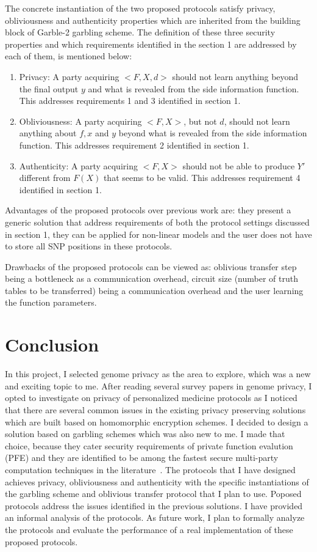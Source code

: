 \documentclass[10pt,letterpaper]{article}
\begin{document}
\begin{multicols}{2}
The concrete instantiation of the two proposed protocols satisfy privacy, obliviousness and authenticity properties which are inherited from the
building block of Garble-2 garbling scheme. The definition of these three security properties and which requirements identified in the section 1 are 
addressed by each of them, is mentioned below:
\begin{enumerate}
 \item Privacy: A party acquiring $<F, X, d>$ should not learn anything beyond the final output $y$ and what is revealed from the side information 
 function. This addresses requirements 1 and 3 identified in section 1. 
 \item Obliviousness: A party acquiring $<F, X>$, but not $d$, should not learn anything about $f, x$ and $y$ beyond what is revealed from the side information 
 function. This addresses requirement 2 identified in section 1.
 \item Authenticity: A party acquiring $<F, X>$ should not be able to produce $Y'$ different from $F(X)$ that seems to be valid. 
 This addresses requirement 4 identified in section 1.
\end{enumerate} 

Advantages of the proposed protocols over previous work are: they present a generic solution that address requirements of both the protocol settings 
discussed in section 1, they can be applied for non-linear models and the user does not have to store all SNP positions in these protocols.

Drawbacks of the proposed protocols can be viewed as: oblivious transfer step being a bottleneck as a communication overhead, circuit size 
(number of truth tables to be transferred) being a communication overhead and the user learning the function parameters.


\section{Conclusion}
In this project, I selected genome privacy as the area to explore, which was a new and exciting topic to me. After reading several survey papers in genome
privacy, I opted to investigate on privacy of personalized medicine protocols as I noticed that there are several common issues in the existing privacy
preserving solutions which are built based on homomorphic encryption schemes. I decided to design a solution based on garbling schemes which was also 
new to me. I made that choice, because they cater security requirements of private function evalution (PFE) and they are identified to be among the fastest 
secure multi-party computation techniques in the literature~\cite{ObliVM}. The protocols that I have designed achieves privacy, obliviousness and authenticity with the 
specific instantiations of the garbling scheme and oblivious transfer protocol that I plan to use. 
Poposed protocols address the issues identified in the previous solutions. I have provided an informal analysis of the protocols. As future work, I plan to 
formally analyze the protocols and evaluate the performance of a real implementation of these proposed protocols.

{\raggedright
\small


}
\appendix
\end{multicols}	
\end{document}
